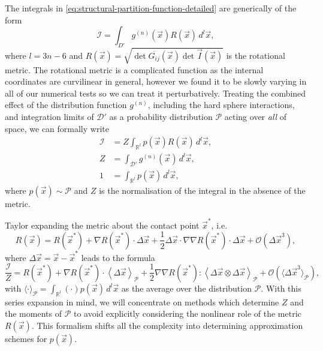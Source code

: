 \documentclass[11pt,twoside]{report}
\begin{document}
The integrals in \eqref{eq:structural-partition-function-detailed} are generically of the form
\begin{equation}\label{eq:schematic-partition-function}
  \mathcal{I}
  =
  \int_{D'}
  g^{(n)}(\vec{x}) R(\vec{x})
  \, d^l \vec{x},
\end{equation}
where $l = 3n - 6$ and $R(\vec{x}) = \sqrt{\det{\overline{G_{ij}}(\vec{x})} \det{\vec{I}(\vec{x})}}$ is the rotational metric.
The rotational metric is a complicated function as the internal coordinates are curvilinear in general, however we found it to be slowly varying in all of our numerical tests so we can treat it perturbatively.
Treating the combined effect of the distribution function $g^{(n)}$, including the hard sphere interactions, and integration limits of $\mathcal{D'}$ as a probability distribution $\mathcal{P}$ acting over \emph{all} of space, we can formally write
\begin{subequations}
  \begin{align}
    \mathcal{I}
    &=
    Z \int_{\mathbb{R}^l} p(\vec{x}) R(\vec{x}) \, d^l \vec{x},
    \\
    Z
    &=
    \int_{\mathcal{D}'} g^{(n)}(\vec{x}) \, d^l \vec{x},
    \\
    1
    &=
    \int_{\mathbb{R}^l} p(\vec{x}) \, d^l \vec{x},
  \end{align}
\end{subequations}
where $p(\vec{x}) \sim \mathcal{P}$ and $Z$ is the normalisation of the integral in the absence of the metric.

Taylor expanding the metric about the contact point $\vec{x}^*$, i.e.\
\begin{equation*}
  R(\vec{x})
  =
  R(\vec{x}^*)
  + \nabla R(\vec{x}^*) \cdot \Delta \vec{x}
  + \frac{1}{2} \Delta\vec{x} \cdot \nabla \nabla R(\vec{x}^*) \cdot \Delta\vec{x}
  + \mathcal{O}(\Delta\vec{x}^3),
\end{equation*}
where $\Delta \vec{x} = \vec{x} - \vec{x}^*$ leads to the formula
\begin{equation}\label{eq:rotation-metric-perturbations}
  \frac{\mathcal{I}}{Z}
  =
  R(\vec{x}^*)
  + \nabla R(\vec{x}^*) \cdot
  \left\langle \Delta \vec{x} \right\rangle_\mathcal{P}
  + \frac{1}{2} \nabla \nabla R(\vec{x}^*) :
  \left\langle \Delta\vec{x} \otimes \Delta\vec{x} \right\rangle_\mathcal{P}
  + \mathcal{O}(\langle \Delta\vec{x}^3 \rangle_\mathcal{P}),
\end{equation}
with $\langle \cdot \rangle_\mathcal{P} = \int_{\mathbb{R}^l} (\cdot) p(\vec{x}) \, d^l \vec{x}$ as the average over the distribution $\mathcal{P}$.
With this series expansion in mind, we will concentrate on methods which determine $Z$ and the moments of $\mathcal{P}$ to avoid explicitly considering the nonlinear role of the metric $R(\vec{x})$.
This formalism shifts all the complexity into determining approximation schemes for $p(\vec{x})$.
\end{document}
